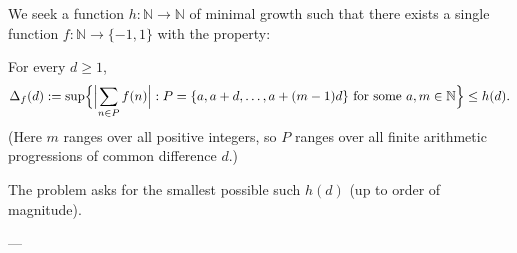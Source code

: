 We seek a function $h:\mathbb N\to\mathbb N$ of minimal growth such that there exists a single function $f:\mathbb N\to\{-1,1\}$ with the property:

For every $d\ge 1$,
\[
\Delta_f(d):=\sup\Bigl\{\Bigl|\sum_{n\in P} f(n)\Bigr| : P=\{a,a+d,\dots,a+(m-1)d\}\text{ for some }a,m\in\mathbb N\Bigr\}\le h(d).
\]
(Here $m$ ranges over all positive integers, so $P$ ranges over all finite arithmetic progressions of common difference $d$.)

The problem asks for the smallest possible such $h(d)$ (up to order of magnitude).

---
